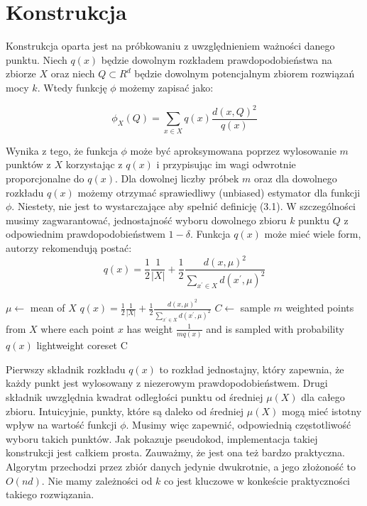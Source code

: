 \section{Konstrukcja}

Konstrukcja oparta jest na próbkowaniu z uwzględnieniem ważności danego punktu.
Niech $q(x)$ będzie dowolnym rozkładem prawdopodobieństwa na zbiorze $X$ oraz niech $Q \subset R^{d}$ będzie dowolnym potencjalnym zbiorem rozwiązań mocy $k$. 
Wtedy funkcję $\phi$ możemy zapisać jako:

\begin{equation}
    \phi_{X}(Q) = \sum_{x \in X} q(x) \frac{d(x, Q)^{2}}{q(x)}
\end{equation}

\noindent
Wynika z tego, że funkcja $\phi$ może być aproksymowana poprzez wylosowanie $m$ punktów z $X$ korzystając z $q(x)$ i przypisując im wagi odwrotnie proporcjonalne do $q(x)$.
Dla dowolnej liczby próbek $m$ oraz dla dowolnego rozkładu $q(x)$ możemy otrzymać sprawiedliwy (unbiased) estymator dla funkcji $\phi$.
Niestety, nie jest to wystarczające aby spełnić definicję (3.1).
W szczególności musimy zagwarantować, jednostajność wyboru dowolnego zbioru $k$ punktu $Q$ z odpowiednim prawdopodobieństwem $1 - \delta$.
Funkcja $q(x)$ może mieć wiele form, autorzy rekomendują postać:
\begin{equation}
    q(x) = \frac{1}{2}\frac{1}{|X|} + \frac{1}{2}\frac{d(x, \mu)^2}{\sum_{x^{'} \in X}d(x^{'}, \mu)^2}
\end{equation}

\begin{algorithm}
    \caption{}
\begin{algorithmic}
     
        \State $\mu \leftarrow$ mean of $X$
            \State $q(x) = \frac{1}{2}\frac{1}{|X|} + \frac{1}{2}\frac{d(x, \mu)^2}{\sum_{x^{'} \in X}d(x^{'}, \mu)^2}$
        \EndFor
        \State $C \leftarrow$ sample $m$ weighted points from $X$ where each point $x$ has weight $\frac{1}{mq(x)}$ and is sampled with probability $q(x)$
    \EndProcedure
    \Return lightweight coreset C
\end{algorithmic}
\end{algorithm}

\noindent
Pierwszy składnik rozkładu $q(x)$ to rozkład jednostajny, który zapewnia, że każdy punkt jest wylosowany z niezerowym prawdopodobieństwem.
Drugi składnik uwzględnia kwadrat odległości punktu od średniej $\mu(X)$ dla całego zbioru.
Intuicyjnie, punkty, które są daleko od średniej $\mu(X)$ mogą mieć istotny wpływ na wartość funkcji $\phi$.
Musimy więc zapewnić, odpowiednią częstotliwość wyboru takich punktów. 
Jak pokazuje pseudokod, implementacja takiej konstrukcji jest całkiem prosta.
Zauważmy, że jest ona też bardzo praktyczna.
Algorytm przechodzi przez zbiór danych jedynie dwukrotnie, a jego złożoność to $O(nd)$.
Nie mamy zależności od $k$ co jest kluczowe w konkeście praktyczności takiego rozwiązania.
